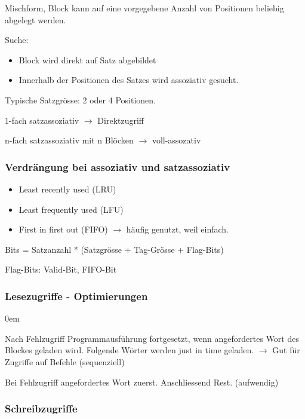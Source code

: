 Mischform, Block kann auf eine vorgegebene Anzahl von Positionen beliebig abgelegt werden.

Suche:
\begin{itemize}\itemsep0em
		\item Block wird direkt auf Satz abgebildet
		\item Innerhalb der Positionen des Satzes wird assoziativ gesucht.
\end{itemize}	
Typische Satzgrösse: 2 oder 4 Positionen.

1-fach satzassoziativ $\rightarrow$  Direktzugriff

n-fach satzassoziativ mit n Blöcken $\rightarrow$  voll-assozativ

\subsubsection{Verdrängung bei assoziativ und satzassoziativ}
\begin{itemize}\itemsep0em
\item Least recently used (LRU)
\item Least frequently used (LFU)
\item First in first out (FIFO) $\rightarrow$  häufig genutzt, weil einfach.
\end{itemize}	

Bits = Satzanzahl * (Satzgrösse + Tag-Grösse + Flag-Bits)

Flag-Bits: Valid-Bit, FIFO-Bit



\subsubsection{Lesezugriffe - Optimierungen}
\begin{description}\itemsep0em
\item[Early-Restart] Nach Fehlzugriff Programmausführung fortgesetzt, wenn angefordertes Wort des Blockes geladen wird. Folgende Wörter werden just in time geladen. $\rightarrow$ Gut für Zugriffe auf Befehle (sequenziell)
\item[Requested Word First] Bei Fehlzugriff angefordertes Wort zuerst. Anschliessend Rest. (aufwendig)
\end{description}

\subsubsection{Schreibzugriffe}

